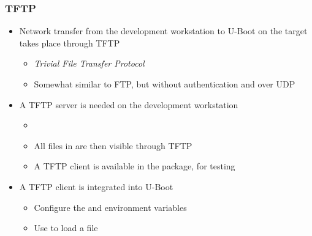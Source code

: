 \begin{frame}
  \frametitle{TFTP}
  \begin{itemize}
  \item Network transfer from the development workstation to U-Boot
    on the target takes place through TFTP
    \begin{itemize}
    \item {\em Trivial File Transfer Protocol}
    \item Somewhat similar to FTP, but without authentication and over
      UDP
    \end{itemize}
  \item A TFTP server is needed on the development workstation
    \begin{itemize}
    \item {}
    \item All files in  are then visible
      through TFTP
    \item A TFTP client is available in the  package,
      for testing
    \end{itemize}
  \item A TFTP client is integrated into U-Boot
    \begin{itemize}
    \item Configure the  and  environment
      variables
    \item Use  to load a file
    \end{itemize}
  \end{itemize}
\end{frame}

